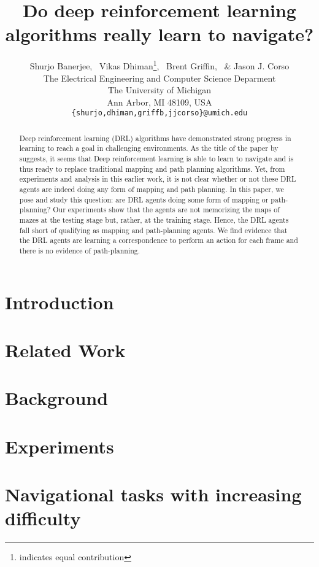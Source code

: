 \documentclass{article} %
\title{Do deep reinforcement learning algorithms really learn to navigate?}
\author{Shurjo Banerjee\footnotemark[1],%
  \, Vikas Dhiman\thanks{indicates equal contribution},%
  \, Brent Griffin,%
  \, \& Jason J. Corso\\
  The Electrical Engineering and Computer Science Deparment\\
The University of Michigan\\
Ann Arbor, MI 48109, USA \\
\texttt{\{shurjo,dhiman,griffb,jjcorso\}@umich.edu} \\
}
\begin{document}
\maketitle

\begin{abstract}
  Deep reinforcement learning (DRL) algorithms have demonstrated strong progress in learning to reach a goal in challenging environments.
  As the title of the paper by \cite{MiPaViICLR2017} suggests, it seems that Deep reinforcement learning is able to learn to navigate and is thus ready to replace traditional mapping and path planning algorithms.
  Yet, from experiments and analysis in this earlier work, it is not clear whether or not these DRL agents are indeed doing any form of mapping and path planning.
  In this paper, we pose and study this question: are DRL agents doing some form of mapping or path-planning?  Our experiments show that the agents are not memorizing the maps of mazes at the testing stage but, rather, at the training stage.
  Hence, the DRL agents fall short of qualifying as mapping and path-planning agents.
  We find evidence that the DRL agents are learning a correspondence to perform an action for each frame and there is no evidence of path-planning.
\end{abstract}

\section{Introduction}
%

\section{Related Work}


\section{Background}


%
\section{Experiments}
\section{Navigational tasks with increasing difficulty}
\label{sec:navtasks}

\end{document}
